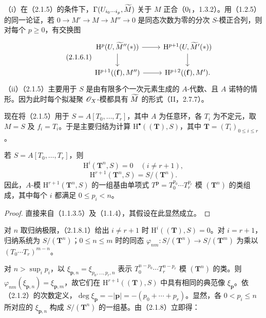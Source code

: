 （i）在（2.1.5）的条件下，$\Gamma(U_{i_0\cdots i_p},\widetilde{M})$ 关于 $M$ 正合（$0_{\mathrm I}$，1.3.2）。用（1.2.5）的同一论证，若 $0\to M'\to M\to M''\to0$ 是同态次数为零的分次 $S$-模正合列，则对每个 $p\geq0$，有交换图
\begin{equation}\tag{2.1.6.1}
\begin{tikzcd}
\mathrm H^p(U,\wt M''(*))\arrow[r]\arrow[d]&\mathrm H^{p+1}(U,\wt M'(*))\arrow[d]\\
\mathrm H^{p+1}((\mathbf f),M'')\arrow[r]&\mathrm H^{p+2}((\mathbf f),M').
\end{tikzcd}
\end{equation}
（ii）（2.1.5）主要用于 $S$ 是由有限多个一次元素生成的 $A$-代数、且 $A$ 诺特的情形。因为此时每个拟凝聚 $\mathscr O_X$-模都具有 $\widetilde{M}$ 的形式（II，2.7.7）。

现在将（2.1.5）用于 $S=A[T_0,\ldots,T_r]$，其中 $A$ 为任意环，各 $T_i$ 为不定元，取 $M=S$ 及 $f_i=T_i$。于是主要归结为计算 $\mathrm H^\bullet((\mathbf T),S)$，其中 $\mathbf T=(T_i)_{0\leq i\leq r}$。

若 $S=A[T_0,\ldots,T_r]$，则
\begin{equation}\tag{2.1.8.1}
\mathrm H^i(\mathbf T^n,S)=0\quad(i\ne r+1),
\end{equation}
\begin{equation}\tag{2.1.8.2}
\mathrm H^{r+1}(\mathbf T^n,S)=S/(\mathbf T^n).
\end{equation}
因此，$A$-模 $\mathrm H^{r+1}(\mathbf T^n,S)$ 的一组基由单项式 $T^{\mathbf p}=T_0^{p_0}\cdots T_r^{p_r}$ 模 $(\mathbf T^n)$ 的类组成，其中每个 $i$ 都满足 $0\leq p_i<n$。
\begin{proof}直接来自（1.1.3.5）及（1.1.4），其假设在此显然成立。\end{proof}

对 $n$ 取归纳极限，（2.1.8.1）给出 $i\ne r+1$ 时 $\mathrm H^i((\mathbf T),S)=0$。对 $i=r+1$，归纳系统为 $S/(\mathbf T^n)$；$0\leq n\leq m$ 时的同态 $\varphi_{nm}:S/(\mathbf T^n)\to S/(\mathbf T^m)$ 为乘以 $(T_0\cdots T_r)^{m-n}$。

对 $n>\sup_i p_i$，以 $\xi_{\mathbf p,n}=\xi_{p_0,\ldots,p_r,n}$ 表示 $T_0^{n-p_0}\cdots T_r^{n-p_r}$ 模 $(\mathbf T^n)$ 的类。则 $\varphi_{nm}(\xi_{\mathbf p,n})=\xi_{\mathbf p,m}$，故它们在 $\mathrm H^{r+1}((\mathbf T),S)$ 中具有相同的典范像 $\xi_{\mathbf p}$。依（2.1.2）的次数定义，$\deg\xi_{\mathbf p}=-|\mathbf p|=-(p_0+\cdots+p_r)$。显然，各 $0<p_i\leq n$ 所对应的 $\xi_{\mathbf p,n}$ 构成 $S/(\mathbf T^n)$ 的一组基。由（2.1.8）立即得：

